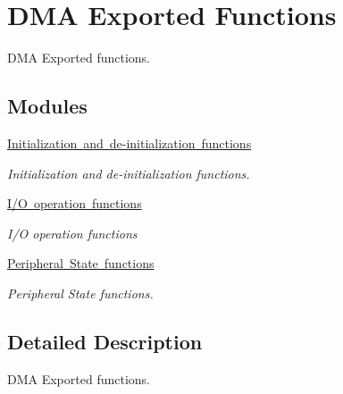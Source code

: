 \hypertarget{group___d_m_a___exported___functions}{}\section{D\+MA Exported Functions}
\label{group___d_m_a___exported___functions}


D\+MA Exported functions.  


\subsection*{Modules}
\begin{DoxyCompactItemize}
\item 
\mbox{\hyperlink{group___d_m_a___exported___functions___group1}{Initialization and de-\/initialization functions}}
\begin{DoxyCompactList}\small\item\em Initialization and de-\/initialization functions. \end{DoxyCompactList}\item 
\mbox{\hyperlink{group___d_m_a___exported___functions___group2}{I/\+O operation functions}}
\begin{DoxyCompactList}\small\item\em I/O operation functions ~\newline
 \end{DoxyCompactList}\item 
\mbox{\hyperlink{group___d_m_a___exported___functions___group3}{Peripheral State functions}}
\begin{DoxyCompactList}\small\item\em Peripheral State functions. \end{DoxyCompactList}\end{DoxyCompactItemize}


\subsection{Detailed Description}
D\+MA Exported functions. 

